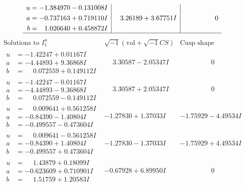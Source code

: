 \documentclass[1p]{elsarticle_modified}
\theoremstyle{definition}
\newcommand{\I}{\sqrt{-1}}
\begin{document}
$$\begin{array}{c|c|c}
\begin{aligned}
u &= -1.384970 - 0.131008 I \\
a &= -0.737163 + 0.719110 I \\
b &= \phantom{-}1.026640 + 0.458872 I\end{aligned}
 & \phantom{-}3.26189 + 3.67751 I & \phantom{-0.000000 } 0\\
 \hline 
 \end{array}$$\newpage$$\begin{array}{c|c|c}  
\text{Solutions to }I^u_{1}& \I (\text{vol} + \sqrt{-1}CS) & \text{Cusp shape}\\
 \hline 
\begin{aligned}
u &= -1.42247 + 0.01167 I \\
a &= -4.44893 + 9.36868 I \\
b &= \phantom{-}0.072559 + 0.149112 I\end{aligned}
 & \phantom{-}3.30587 - 2.05347 I & \phantom{-0.000000 } 0 \\ \hline\begin{aligned}
u &= -1.42247 - 0.01167 I \\
a &= -4.44893 - 9.36868 I \\
b &= \phantom{-}0.072559 - 0.149112 I\end{aligned}
 & \phantom{-}3.30587 + 2.05347 I & \phantom{-0.000000 } 0 \\ \hline\begin{aligned}
u &= \phantom{-}0.009641 + 0.561258 I \\
a &= -0.84390 - 1.40804 I \\
b &= -0.499557 - 0.473604 I\end{aligned}
 & -1.27830 + 1.37033 I & -1.75929 - 4.49534 I \\ \hline\begin{aligned}
u &= \phantom{-}0.009641 - 0.561258 I \\
a &= -0.84390 + 1.40804 I \\
b &= -0.499557 + 0.473604 I\end{aligned}
 & -1.27830 - 1.37033 I & -1.75929 + 4.49534 I \\ \hline\begin{aligned}
u &= \phantom{-}1.43879 + 0.18099 I \\
a &= -0.623609 + 0.710901 I \\
b &= \phantom{-}1.51759 + 1.20583 I\end{aligned}
 & -0.67928 + 6.89950 I & \phantom{-0.000000 } 0 \\ \hline\begin{aligned}

\end{aligned}
\end{array}$$
\end{document}

